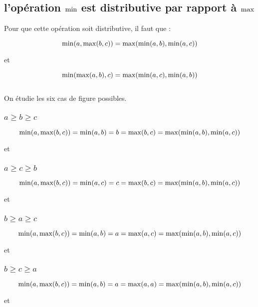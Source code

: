 \documentclass{article}
\begin{document}
\subsection{l'opération $\mmin$ est distributive par rapport à $\mmax$}

Pour que cette opération soit distributive, il faut que :

$$\mmin(a, \mmax(b,c)) = \mmax(\mmin(a,b),\mmin(a,c))$$
\begin{center}et\end{center}
$$\mmin(\mmax(a,b),c) = \mmax(\mmin(a,c),\mmin(a,b))$$\\

On étudie les six cas de figure possibles.

\subsubsection{$a \geq b \geq c$}

$$\mmin(a, \mmax(b, c)) = \mmin(a, b) = b = \mmax(b,c) = \mmax(\mmin(a, b),\mmin(a,c))$$
\begin{center}et\end{center}

\subsubsection{$a \geq c \geq b$}

$$\mmin(a, \mmax(b, c)) = \mmin(a, c) = c = \mmax(b,c) = \mmax(\mmin(a, b),\mmin(a,c))$$
\begin{center}et\end{center}

\subsubsection{$b \geq a \geq c$}

$$\mmin(a, \mmax(b, c)) = \mmin(a, b) = a = \mmax(a,c) = \mmax(\mmin(a, b),\mmin(a,c))$$
\begin{center}et\end{center}

\subsubsection{$b \geq c \geq a$}

$$\mmin(a, \mmax(b, c)) = \mmin(a, b) = a = \mmax(a,a) = \mmax(\mmin(a, b),\mmin(a,c))$$
\begin{center}et\end{center}
\end{document}
